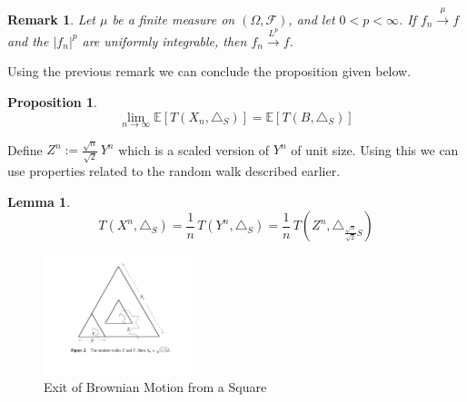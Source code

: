 \documentclass[11pt, a4paper, oneside]{report}
\numberwithin{equation}{section}
\newtheorem{lemma}[theorem]{Lemma}
\newtheorem{proposition}[theorem]{Proposition}
\newtheorem{remark}[theorem]{Remark}
\begin{document}
\begin{remark}\cite{MR1810041}
Let $\mu$ be a finite measure on $(\Omega, \mathcal{F})$, and let $0 < p < \infty$. If 
$f_n \xrightarrow{\mu} f$ and the $|f_n|^p$ are uniformly integrable, then 
$f_n \xrightarrow{L^p} f$.

\end{remark}
\noindent Using the previous remark we can conclude the proposition given below.
\begin{proposition}\cite[Proposition 5]{research}
\[
\lim_{n \to \infty} \mathbb{E}\left[T(X_n, \triangle_S)\right] = \mathbb{E}\left[T(B, \triangle_S)\right]
\]
\end{proposition}
\noindent Define \(Z^n:= \frac{\sqrt{n}}{\sqrt{2}} \, Y^n\) which is a scaled version of \(Y^n\) of unit size. Using this we can use properties related to the random walk described earlier.
\begin{lemma}\cite[Lemma 6]{research}
\[
T(X^n, \triangle_S) = \frac{1}{n} \, T(Y^n, \triangle_S) = \frac{1}{n} \, T\left(Z^n,\triangle_{ \frac{\sqrt{n}}{\sqrt2}S}\right)
\]

\end{lemma}
\begin{figure}[htbp]
    \centering
    \includegraphics[width=0.4\textwidth]{Screenshot 2025-07-03 132030.png}
    \caption{Exit of Brownian Motion from a Square}
\end{figure}
\end{document}
